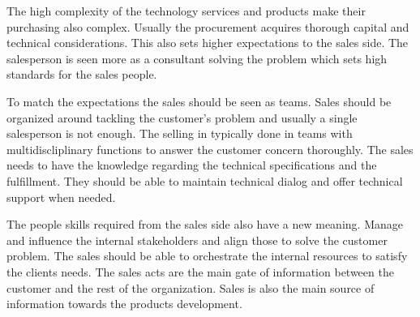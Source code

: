 \documentclass[12pt,a4paper,oneside,pdftex]{report}
\begin{document}
The high complexity of the technology services and products make their purchasing also complex. Usually the procurement acquires thorough capital and technical considerations. This also sets higher expectations to the sales side. The salesperson is seen more as a consultant solving the problem which sets high standards for the sales people. \citep{Sharma}

To match the expectations the sales should be seen as teams. Sales should be organized around tackling the customer's problem and usually a single salesperson is not enough. The selling in typically done in teams with multidiscliplinary functions to answer the customer concern thoroughly. The sales needs to have the knowledge regarding the technical specifications and the fulfillment. They should be able to maintain technical dialog and offer technical support when needed.  \citep{Sharma}

The people skills required from the sales side also have a new meaning. Manage and influence the internal stakeholders and align those to solve the customer problem. The sales should be able to orchestrate the internal resources to satisfy the clients needs. The sales acts are the main gate of information between the customer and the rest of the organization. Sales is also the main source of information towards the products development.  \citep{Sharma}
\end{document}

